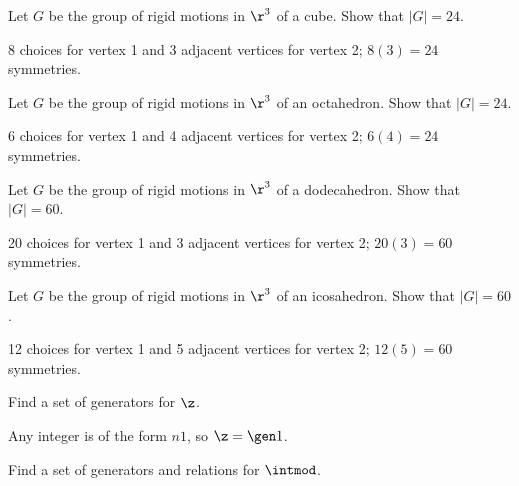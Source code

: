 \begin{exercise} \label{ex1.2.10}
    Let $G$ be the group of rigid motions in $\r^3$ of a cube. Show that $|G| = 24$.
\end{exercise}

\begin{sol}
    8 choices for vertex 1 and 3 adjacent vertices for vertex 2; $8(3) = 24$ symmetries.
\end{sol}

\begin{exercise} \label{ex1.2.11}
    Let $G$ be the group of rigid motions in $\r^3$ of an octahedron. Show that $|G| = 24$.
\end{exercise}

\begin{sol}
    6 choices for vertex 1 and 4 adjacent vertices for vertex 2; $6(4) = 24$ symmetries.
\end{sol}

\begin{exercise}\label{ex1.2.12}
    Let $G$ be the group of rigid motions in $\r^3$ of a dodecahedron. Show that $|G| = 60$.
\end{exercise}

\begin{sol}
    20 choices for vertex 1 and 3 adjacent vertices for vertex 2; $20(3) = 60$ symmetries.
\end{sol}

\begin{exercise}\label{ex1.2.13}
    Let $G$ be the group of rigid motions in $\r^3$ of an icosahedron. Show that $|G| = 60$.
\end{exercise}

\begin{sol}
    12 choices for vertex 1 and 5 adjacent vertices for vertex 2; $12(5) = 60$ symmetries.
\end{sol}

\begin{exercise}\label{ex1.2.14}
    Find a set of generators for $\z$.
\end{exercise}

\begin{sol}
    Any integer is of the form $n1$, so $\z = \gen 1$.
\end{sol}

\begin{exercise}\label{ex1.2.15}
    Find a set of generators and relations for $\intmod$.
\end{exercise}

